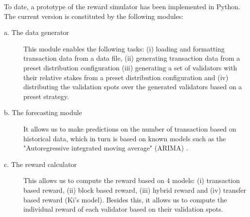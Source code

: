 To date, a prototype of the reward simulator has been implemented in Python. The current version is constituted by the following modules:

\begin{description}
    \item[a. The data generator] This module enables the following tasks: (i) loading and formatting transaction data from a data file, (ii) generating transaction data from a preset distribution configuration (iii)  generating a set of validators with their relative stakes from a preset distribution configuration and (iv) distributing the validation spots over the generated validators based on a preset strategy.

    \item[b. The forecasting module] It allows us to make predictions on the number of transaction based on historical data, which in turn is based on known models such as the "Autoregressive integrated moving average" (ARIMA) \cite{saboia1977autoregressive}.

    \item[c. The reward calculator] This  allows us to compute the reward based on 4 models: (i) transaction based reward, (ii) block based reward, (iii) hybrid reward and (iv) transfer based reward (Ki's model). Besides this, it allows us to compute the individual reward of each validator based on their validation spots.
\end{description}

